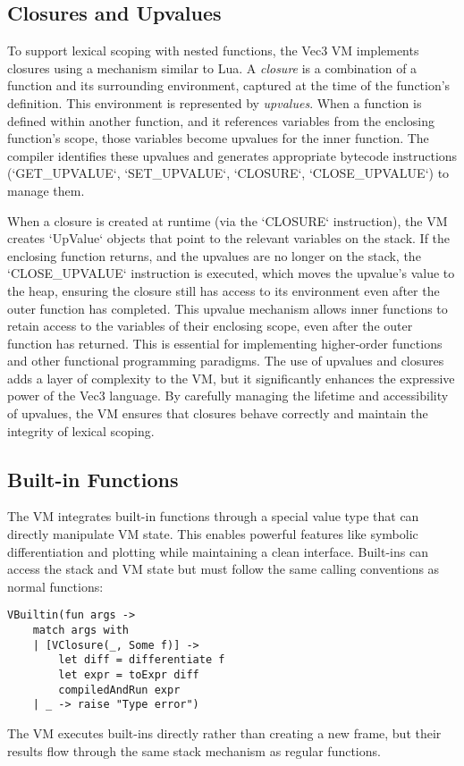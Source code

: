 \subsection{Closures and Upvalues}
To support lexical scoping with nested functions, the Vec3 VM implements closures using a mechanism similar to Lua. A \textit{closure} is a combination of a function and its surrounding environment, captured at the time of the function's definition. This environment is represented by \textit{upvalues}.
When a function is defined within another function, and it references variables from the enclosing function's scope, those variables become upvalues for the inner function.  The compiler identifies these upvalues and generates appropriate bytecode instructions (`GET_UPVALUE`, `SET_UPVALUE`, `CLOSURE`, `CLOSE_UPVALUE`) to manage them.

When a closure is created at runtime (via the `CLOSURE` instruction), the VM creates `UpValue` objects that point to the relevant variables on the stack. If the enclosing function returns, and the upvalues are no longer on the stack, the `CLOSE_UPVALUE` instruction is executed, which moves the upvalue's value to the heap, ensuring the closure still has access to its environment even after the outer function has completed.
This upvalue mechanism allows inner functions to retain access to the variables of their enclosing scope, even after the outer function has returned. This is essential for implementing higher-order functions and other functional programming paradigms. The use of upvalues and closures adds a layer of complexity to the VM, but it significantly enhances the expressive power of the Vec3 language. By carefully managing the lifetime and accessibility of upvalues, the VM ensures that closures behave correctly and maintain the integrity of lexical scoping.

\subsection{Built-in Functions}
The VM integrates built-in functions through a special value type that can directly manipulate VM state. This enables powerful features like symbolic differentiation and plotting while maintaining a clean interface. Built-ins can access the stack and VM state but must follow the same calling conventions as normal functions:
\begin{verbatim}
VBuiltin(fun args ->
    match args with
    | [VClosure(_, Some f)] ->
        let diff = differentiate f
        let expr = toExpr diff
        compiledAndRun expr
    | _ -> raise "Type error")
\end{verbatim}
The VM executes built-ins directly rather than creating a new frame, but their results flow through the same stack mechanism as regular functions.
